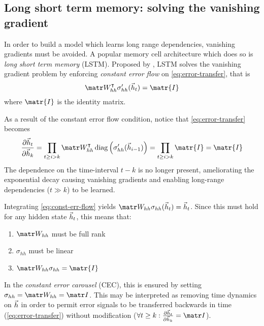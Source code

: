 \subsection{Long short term memory: solving the vanishing gradient}\label{sec:LSTM}


In order to build a model which learns long range dependencies, vanishing
gradients must be avoided. A popular memory cell architecture which does so is
\emph{long short term memory} (LSTM). Proposed by \citet{hochreiter1997long},
LSTM solves the vanishing gradient problem by enforcing \emph{constant error
flow} on \cref{eq:error-transfer}, that is
\begin{equation}\label{eq:const-err-flow}
    \W_{hh}^\tp \sigma_{hh}' (\h_{t}) = \matr{I}
\end{equation}
where $\matr{I}$ is the identity matrix.

As a result of the constant error flow condition, notice that \vref{eq:error-transfer}
becomes
\begin{equation}
  \frac{\pd \h_t}{\pd \h_k}
  = \prod_{t \geq i > k} \W_{hh}^\tp \diag \left( \sigma_{hh}'( \h_{i-1} ) \right)
  = \prod_{t \geq i > k} \matr{I}
  = \matr{I}
\end{equation}
The dependence on the time-interval $t-k$ is no longer present, ameliorating
the exponential decay causing vanishing gradients and enabling long-range
dependencies (\ie $t \gg k$) to be learned.

Integrating \cref{eq:const-err-flow} yields $\W_{hh} \sigma_{hh}(\h_{t}) = \h_{t}$.
Since this must hold for any hidden state $\vec{h}_{t}$, this means that:
\begin{enumerate}
    \item $\W_{hh}$ must be full rank
    \item $\sigma_{hh}$ must be linear
    \item $\W_{hh} \sigma_{hh} = \matr{I}$
\end{enumerate}

In the \emph{constant error carousel} (CEC), this is ensured by setting
$\sigma_{hh} = \W_{hh} = \I$. This may be interpreted as removing time dynamics
on $\vec{h}$ in order to permit error signals to be transferred backwards in time
(\cref{eq:error-transfer}) without modification (\ie $\forall t \geq k: \frac{\pd
\h_t}{\pd \h_k} = \I$).

